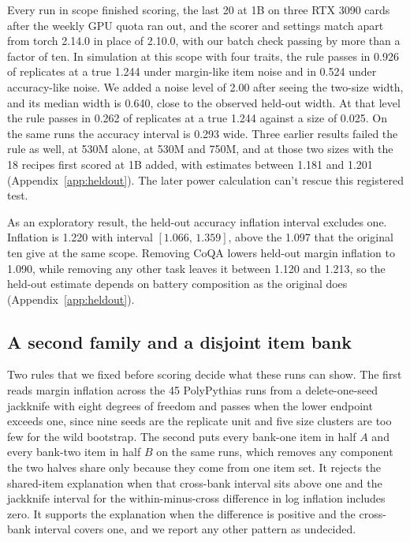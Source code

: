 \documentclass{article}
\newcommand{\ci}[2]{\ensuremath{[#1,\,#2]}}
\begin{document}
Every run in scope finished scoring, the last 20 at 1B on three RTX 3090 cards after the weekly GPU quota ran out, and the scorer and settings match apart from torch 2.14.0 in place of 2.10.0, with our batch check passing by more than a factor of ten. In simulation at this scope with four traits, the rule passes in 0.926 of replicates at a true 1.244 under margin-like item noise and in 0.524 under accuracy-like noise. We added a noise level of 2.00 after seeing the two-size width, and its median width is 0.640, close to the observed held-out width. At that level the rule passes in 0.262 of replicates at a true 1.244 against a size of 0.025. On the same runs the accuracy interval is 0.293 wide. Three earlier results failed the rule as well, at 530M alone, at 530M and 750M, and at those two sizes with the 18 recipes first scored at 1B added, with estimates between 1.181 and 1.201 (Appendix~\ref{app:heldout}). The later power calculation can't rescue this registered test.

As an exploratory result, the held-out accuracy inflation interval excludes one. Inflation is 1.220 with interval \ci{1.066}{1.359}, above the 1.097 that the original ten give at the same scope. Removing CoQA lowers held-out margin inflation to 1.090, while removing any other task leaves it between 1.120 and 1.213, so the held-out estimate depends on battery composition as the original does (Appendix~\ref{app:heldout}).

\subsection{A second family and a disjoint item bank}
\label{sec:family}
Two rules that we fixed before scoring decide what these runs can show. The first reads margin inflation across the 45 PolyPythias runs from a delete-one-seed jackknife with eight degrees of freedom and passes when the lower endpoint exceeds one, since nine seeds are the replicate unit and five size clusters are too few for the wild bootstrap. The second puts every bank-one item in half $A$ and every bank-two item in half $B$ on the same runs, which removes any component the two halves share only because they come from one item set. It rejects the shared-item explanation when that cross-bank interval sits above one and the jackknife interval for the within-minus-cross difference in log inflation includes zero. It supports the explanation when the difference is positive and the cross-bank interval covers one, and we report any other pattern as undecided.
\end{document}
